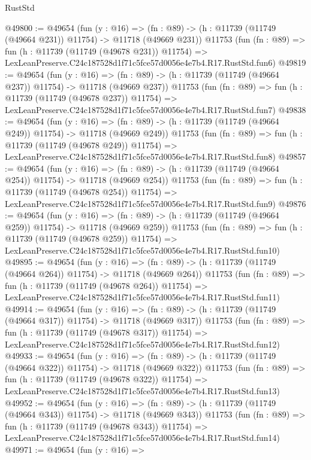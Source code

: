 \begin{lexlean}{RustStd}
\begin{coremodule}
@49800 := @49654
    (fun (y : @16) =>
    (fn : @89) -> (h : @11739 (@11749 (@49664 @231)) @11754) -> @11718 (@49669 @231))
    @11753
    (fun (fn : @89) =>
    fun (h : @11739 (@11749 (@49678 @231)) @11754) =>
    LexLeanPreserve.C24c187528d1f71c5fce57d0056e4e7b4.R17.RustStd.fun6)
@49819 := @49654
    (fun (y : @16) =>
    (fn : @89) -> (h : @11739 (@11749 (@49664 @237)) @11754) -> @11718 (@49669 @237))
    @11753
    (fun (fn : @89) =>
    fun (h : @11739 (@11749 (@49678 @237)) @11754) =>
    LexLeanPreserve.C24c187528d1f71c5fce57d0056e4e7b4.R17.RustStd.fun7)
@49838 := @49654
    (fun (y : @16) =>
    (fn : @89) -> (h : @11739 (@11749 (@49664 @249)) @11754) -> @11718 (@49669 @249))
    @11753
    (fun (fn : @89) =>
    fun (h : @11739 (@11749 (@49678 @249)) @11754) =>
    LexLeanPreserve.C24c187528d1f71c5fce57d0056e4e7b4.R17.RustStd.fun8)
@49857 := @49654
    (fun (y : @16) =>
    (fn : @89) -> (h : @11739 (@11749 (@49664 @254)) @11754) -> @11718 (@49669 @254))
    @11753
    (fun (fn : @89) =>
    fun (h : @11739 (@11749 (@49678 @254)) @11754) =>
    LexLeanPreserve.C24c187528d1f71c5fce57d0056e4e7b4.R17.RustStd.fun9)
@49876 := @49654
    (fun (y : @16) =>
    (fn : @89) -> (h : @11739 (@11749 (@49664 @259)) @11754) -> @11718 (@49669 @259))
    @11753
    (fun (fn : @89) =>
    fun (h : @11739 (@11749 (@49678 @259)) @11754) =>
    LexLeanPreserve.C24c187528d1f71c5fce57d0056e4e7b4.R17.RustStd.fun10)
@49895 := @49654
    (fun (y : @16) =>
    (fn : @89) -> (h : @11739 (@11749 (@49664 @264)) @11754) -> @11718 (@49669 @264))
    @11753
    (fun (fn : @89) =>
    fun (h : @11739 (@11749 (@49678 @264)) @11754) =>
    LexLeanPreserve.C24c187528d1f71c5fce57d0056e4e7b4.R17.RustStd.fun11)
@49914 := @49654
    (fun (y : @16) =>
    (fn : @89) -> (h : @11739 (@11749 (@49664 @317)) @11754) -> @11718 (@49669 @317))
    @11753
    (fun (fn : @89) =>
    fun (h : @11739 (@11749 (@49678 @317)) @11754) =>
    LexLeanPreserve.C24c187528d1f71c5fce57d0056e4e7b4.R17.RustStd.fun12)
@49933 := @49654
    (fun (y : @16) =>
    (fn : @89) -> (h : @11739 (@11749 (@49664 @322)) @11754) -> @11718 (@49669 @322))
    @11753
    (fun (fn : @89) =>
    fun (h : @11739 (@11749 (@49678 @322)) @11754) =>
    LexLeanPreserve.C24c187528d1f71c5fce57d0056e4e7b4.R17.RustStd.fun13)
@49952 := @49654
    (fun (y : @16) =>
    (fn : @89) -> (h : @11739 (@11749 (@49664 @343)) @11754) -> @11718 (@49669 @343))
    @11753
    (fun (fn : @89) =>
    fun (h : @11739 (@11749 (@49678 @343)) @11754) =>
    LexLeanPreserve.C24c187528d1f71c5fce57d0056e4e7b4.R17.RustStd.fun14)
@49971 := @49654
    (fun (y : @16) =>

\end{coremodule}
\end{lexlean}
